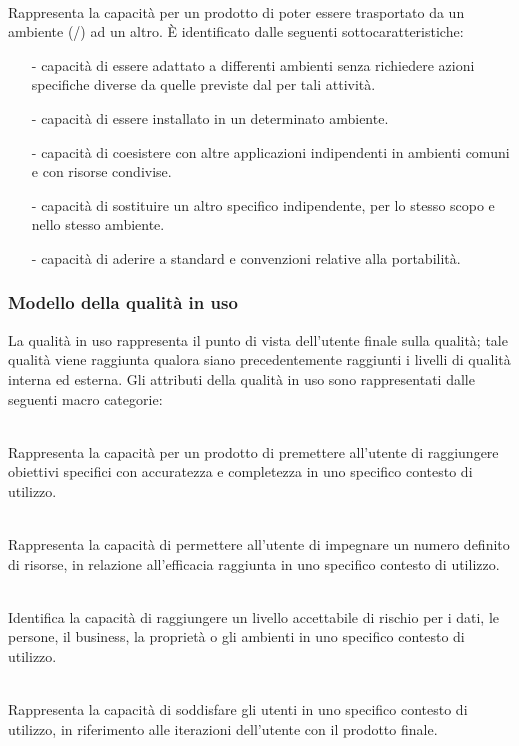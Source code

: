 \documentclass[a4paper, titlepage]{article}
\begin{document}
\begin{description}
\item {}
\\ Rappresenta la capacità per un prodotto  di poter essere trasportato da un ambiente (/) ad un altro.
\newline È identificato dalle seguenti sottocaratteristiche:
\begin{itemize}
\item[-] capacità di essere adattato a differenti ambienti senza richiedere azioni specifiche diverse da quelle previste dal  per tali attività.
\item[-] capacità di essere installato in un determinato ambiente.
\item[-] capacità di coesistere con altre applicazioni indipendenti in ambienti comuni e con risorse condivise.
\item[-] capacità di sostituire un altro  specifico indipendente, per lo stesso scopo e nello stesso ambiente.
\item[-] capacità di aderire a standard e convenzioni relative alla portabilità.
\end{itemize}
\end{description}

\subsubsection{Modello della qualità in uso}
La qualità in uso rappresenta il punto di vista dell'utente finale sulla qualità; tale qualità viene raggiunta qualora siano precedentemente raggiunti i livelli di qualità interna ed esterna.
\newline Gli attributi della qualità in uso sono rappresentati dalle seguenti macro categorie:
\begin{description}
\item {}
\\ Rappresenta la capacità per un prodotto  di premettere all'utente di raggiungere obiettivi specifici con accuratezza e completezza in uno specifico contesto di utilizzo.
\item {}
\\Rappresenta la capacità di permettere all'utente di impegnare un numero definito di risorse, in relazione all'efficacia raggiunta in uno specifico contesto di utilizzo.
\item {} 
\\ Identifica la capacità di raggiungere un livello accettabile di rischio per i dati, le persone, il business, la proprietà o gli ambienti in uno specifico contesto di utilizzo.
\item {}
\\ Rappresenta la capacità di soddisfare gli utenti in uno specifico contesto di utilizzo, in riferimento alle iterazioni dell'utente con il prodotto finale.
\end{description}
\end{document}
